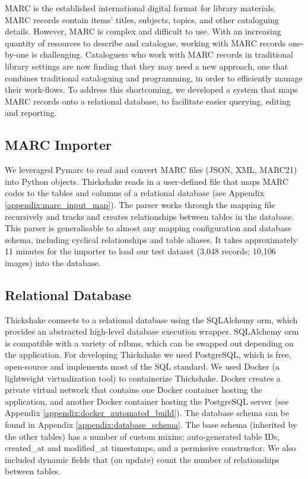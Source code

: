 \documentclass[10pt, a4paper]{article}
\begin{document}
\label{subsection:library_interface:introduction}
MARC is the established international digital format for library materials. MARC records contain items' titles, subjects, topics, and other cataloguing details. However, MARC is complex and difficult to use. With an increasing quantity of resources to describe and catalogue, working with MARC records one-by-one is challenging. Cataloguers who work with MARC records in traditional library settings are now finding that they may need a new approach, one that combines traditional cataloguing and programming, in order to efficiently manage their work-flows. To address this shortcoming, we developed a system that maps MARC records onto a relational database, to facilitate easier querying, editing and reporting.

\subsection{MARC Importer}
\label{subsection:library_interface:marc_importer}
We leveraged Pymarc \cite{pymarc} to read and convert MARC files (JSON, XML, MARC21) into Python objects. Thickshake reads in a user-defined file that maps MARC codes to the tables and columns of a relational database (see Appendix \ref{appendix:marc_input_map}). The parser works through the mapping file recursively and tracks and creates relationships between tables in the database. This parser is generalisable to almost any mapping configuration and database schema, including cyclical relationships and table aliases. It takes approximately 11 minutes for the importer to load our test dataset (3,048 records; 10,106 images) into the database.

\subsection{Relational Database}
\label{subsection:library_interface:relational_database}
Thickshake connects to a relational database using the SQLAlchemy \Gls{orm}, which provides an abstracted high-level database execution wrapper. SQLAlchemy \Gls{orm} is compatible with a variety of \Gls{rdbms}, which can be swapped out depending on the application. For developing Thickshake we used PostgreSQL, which is free, open-source and implements most of the SQL standard. We used Docker (a lightweight virtualization tool) to containerize Thickshake. Docker creates a private virtual network that contains one Docker container hosting the application, and another Docker container hosting the PostgreSQL server (see Appendix \ref{appendix:docker_automated_build}). The database schema can be found in Appendix \ref{appendix:database_schema}. The base schema (inherited by the other tables) has a number of custom mixins: auto-generated table IDs, created\_at and modified\_at timestamps, and a permissive constructor. We also included dynamic fields that (on update) count the number of relationships between tables.
\end{document}
